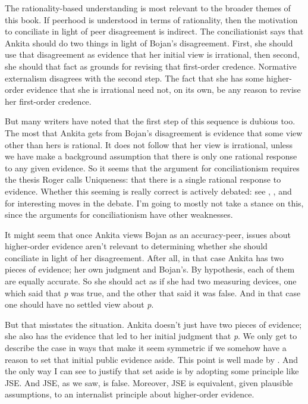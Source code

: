 The rationality-based understanding is most relevant to the broader themes of this book. If peerhood is understood in terms of rationality, then the motivation to conciliate in light of peer disagreement is indirect. The conciliationist says that \gls{Ankita} should do two things in light of \gls{Bojan}'s disagreement. First, she should use that disagreement as evidence that her initial view is irrational, then second, she should that fact as grounds for revising that first-order credence. Normative externalism disagrees with the second step. The fact that she has some higher-order evidence that she is irrational need not, on its own, be any reason to revise her first-order credence.

But many writers have noted that the first step of this sequence is dubious too. The most that \gls{Ankita} gets from \gls{Bojan}'s disagreement is evidence that some view other than hers is rational. It does not follow that her view is irrational, unless we have make a background assumption that there is only one rational response to any given evidence. So it seems that the argument for conciliationism requires the thesis Roger \citet{White2005} calls Uniqueness: that there is a single rational response to evidence. Whether this seeming is really correct is actively debated: see \citet{Douven2009}, \citet{Kelly2010}, and \citet{BallantyneCoffman2011, BallantyneCoffman2012} for interesting moves in the debate. I'm going to mostly not take a stance on this, since the arguments for conciliationism have other weaknesses.

It might seem that once \gls{Ankita} views \gls{Bojan} as an accuracy-peer, issues about higher-order evidence aren't relevant to determining whether she should conciliate in light of her disagreement. After all, in that case \gls{Ankita} has two pieces of evidence; her own judgment and \gls{Bojan}'s. By hypothesis, each of them are equally accurate. So she should act as if she had two measuring devices, one which said that \emph{p} was true, and the other that said it was false. And in that case one should have no settled view about \emph{p}.

But that misstates the situation. \gls{Ankita} doesn't just have two pieces of evidence; she also has the evidence that led to her initial judgment that \emph{p}. We only get to describe the case in ways that make it seem symmetric if we somehow have a reason to set that initial public evidence aside. This point is well made by \citet{Kelly2010}. And the only way I can see to justify that set aside is by adopting some principle like JSE. And JSE, as we saw, is false. Moreover, JSE is equivalent, given plausible assumptions, to an internalist principle about higher-order evidence.


